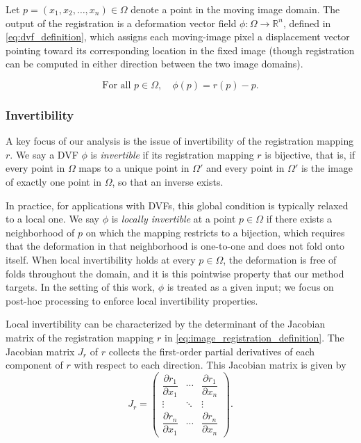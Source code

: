 \documentclass[lettersize,journal]{IEEEtran}
\begin{document}
Let $p = (x_1, x_2, \ldots, x_n) \in \Omega$ denote a point in the moving image domain. The output of the registration is a deformation vector field $\phi: \Omega \to \mathbb{R}^n$, defined in \autoref{eq:dvf_definition}, which assigns each moving-image pixel a displacement vector pointing toward its corresponding location in the fixed image (though registration can be computed in either direction between the two image domains).

\begin{equation} \label{eq:dvf_definition}
    \text{For all } p \in \Omega, \quad \phi(p) = r(p) - p.
\end{equation}

\subsubsection{Invertibility}
\label{sec:invertibility}

A key focus of our analysis is the issue of invertibility of the registration mapping $r$. We say a DVF $\phi$ is \emph{invertible} if its registration mapping $r$ is bijective, that is, if every point in $\Omega$ maps to a unique point in $\Omega'$ and every point in $\Omega'$ is the image of exactly one point in $\Omega$, so that an inverse exists.

In practice, for applications with DVFs, this global condition is typically relaxed to a local one. We say $\phi$ is \emph{locally invertible} at a point $p \in \Omega$ if there exists a neighborhood of $p$ on which the mapping restricts to a bijection, which requires that the deformation in that neighborhood is one-to-one and does not fold onto itself. When local invertibility holds at every $p \in \Omega$, the deformation is free of folds throughout the domain, and it is this pointwise property that our method targets. In the setting of this work, $\phi$ is treated as a given input; we focus on post-hoc processing to enforce local invertibility properties.

Local invertibility can be characterized by the determinant of the Jacobian matrix of the registration mapping $r$ in \autoref{eq:image_registration_definition}. The Jacobian matrix $J_r$ of $r$ collects the first-order partial derivatives of each component of $r$ with respect to each direction. This Jacobian matrix is given by
\begin{equation} \label{eq:general_jacobian_matrix}
    J_r = 
    \begin{pmatrix}
        \dfrac{\partial r_1}{\partial x_1} & \cdots & \dfrac{\partial r_1}{\partial x_n} \\[6pt]
        \vdots & \ddots & \vdots \\[6pt]
        \dfrac{\partial r_n}{\partial x_1} & \cdots & \dfrac{\partial r_n}{\partial x_n}
    \end{pmatrix}.
\end{equation}
\end{document}

